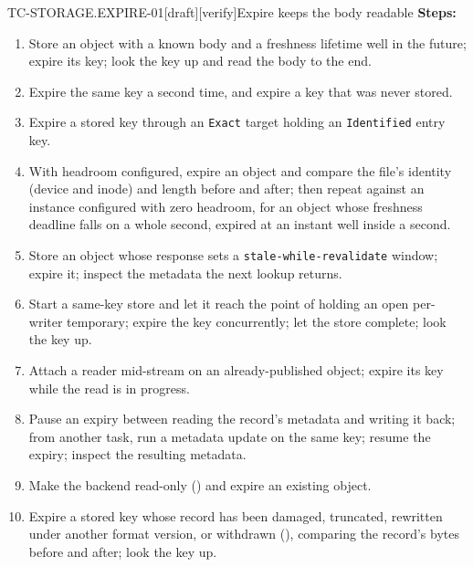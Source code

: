 \begin{requirement}{TC-STORAGE.EXPIRE-01}[draft][verify]{Expire keeps the body readable}
  \textbf{Steps:}
  \begin{enumerate}
    \item Store an object with a known body and a freshness lifetime well in
      the future; expire its key; look the key up and read the body to the
      end.
    \item Expire the same key a second time, and expire a key that was never
      stored.
    \item Expire a stored key through an \texttt{Exact} target holding an
      \texttt{Identified} entry key.
    \item With headroom configured, expire an object and compare the file's
      identity (device and inode) and length before and after; then repeat
      against an instance configured with zero headroom, for an object whose
      freshness deadline falls on a whole second, expired at an instant well
      inside a second.
    \item Store an object whose response sets a
      \texttt{stale-while-revalidate} window; expire it; inspect the metadata
      the next lookup returns.
    \item Start a same-key store and let it reach the point of holding an open
      per-writer temporary; expire the key concurrently; let the store
      complete; look the key up.
    \item Attach a reader mid-stream on an already-published object; expire its
      key while the read is in progress.
    \item Pause an expiry between reading the record's metadata and writing it
      back; from another task, run a metadata update on the same key; resume the
      expiry; inspect the resulting metadata.
    \item Make the backend read-only () and
      expire an existing object.
    \item Expire a stored key whose record has been damaged, truncated,
      rewritten under another format version, or withdrawn
      (), comparing the record's bytes
      before and after; look the key up.
  \end{enumerate}


\end{requirement}
